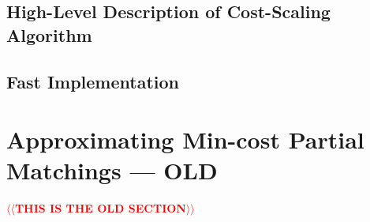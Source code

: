 \documentclass[11pt]{article}
\makeatletter
\def\eps{\varepsilon}
\theoremstyle{plain}
\numberwithin{figure}{section}
\def\n@te#1{\textsf{\boldmath \textbf{$\langle\!\langle$#1$\rangle\!\rangle$}}\leavevmode}
\def\note#1{\textcolor{red}{\n@te{#1}}}
\makeatother
\begin{document}


\subsection{High-Level Description of Cost-Scaling Algorithm}

\subsection{Fast Implementation}




\section{Approximating Min-cost Partial Matchings --- OLD}
\label{section:goldberg}

\note{THIS IS THE OLD SECTION}
\end{document}
